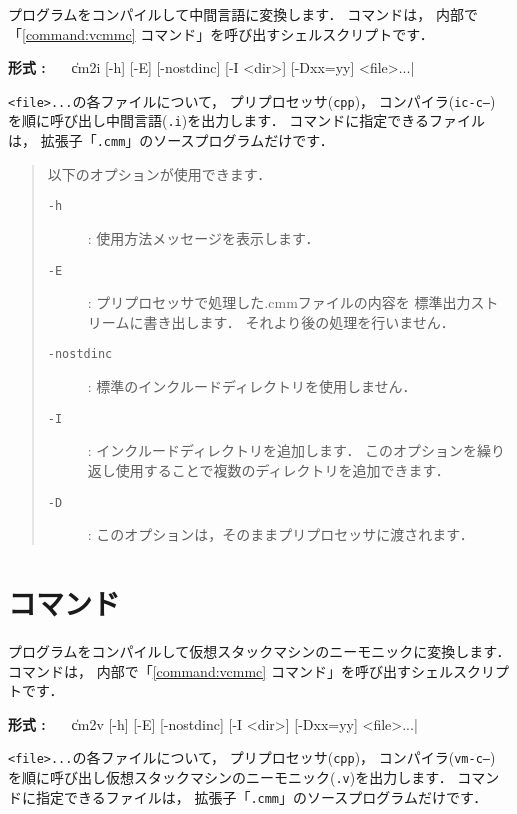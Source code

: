 {\cmm}プログラムをコンパイルして中間言語に変換します．
{\cmi}コマンドは，
内部で「\ref{command:vcmmc} {\icmmc}コマンド」を呼び出すシェルスクリプトです．

\begin{flushleft}
{\bf 形式 : }~~~\|cm2i [-h] [-E] [-nostdinc] [-I <dir>] [-Dxx=yy] <file>...|
\end{flushleft}

{\tt <file>...}の各ファイルについて，
プリプロセッサ({\tt cpp})，
コンパイラ({\tt ic-c--})
を順に呼び出し中間言語({\tt .i})を出力します．
{\cmi}コマンドに指定できるファイルは，
拡張子「{\tt .cmm}」の{\cmml}ソースプログラムだけです．

\begin{quote}
\hspace{-1em}以下のオプションが使用できます．

\begin{description}
\item[{\tt -h}] : 使用方法メッセージを表示します．
\item[{\tt -E}] : プリプロセッサで処理した{.cmm}ファイルの内容を
標準出力ストリームに書き出します．
それより後の処理を行いません．
\item[{\tt -nostdinc}] : 標準のインクルードディレクトリを使用しません．
\item[{\tt -I}] : インクルードディレクトリを追加します．
このオプションを繰り返し使用することで複数のディレクトリを追加できます．
\item[{\tt -D}] : このオプションは，そのままプリプロセッサに渡されます．
\end{description}
\end{quote}

\section{{\cmv}コマンド}

{\cmm}プログラムをコンパイルして仮想スタックマシンのニーモニックに変換します．
{\cmv}コマンドは，
内部で「\ref{command:vcmmc} {\vcmmc}コマンド」を呼び出すシェルスクリプトです．

\begin{flushleft}
{\bf 形式 : }~~~\|cm2v [-h] [-E] [-nostdinc] [-I <dir>] [-Dxx=yy] <file>...|
\end{flushleft}

{\tt <file>...}の各ファイルについて，
プリプロセッサ({\tt cpp})，
コンパイラ({\tt vm-c--})
を順に呼び出し仮想スタックマシンのニーモニック({\tt .v})を出力します．
{\cmv}コマンドに指定できるファイルは，
拡張子「{\tt .cmm}」の{\cmml}ソースプログラムだけです．

